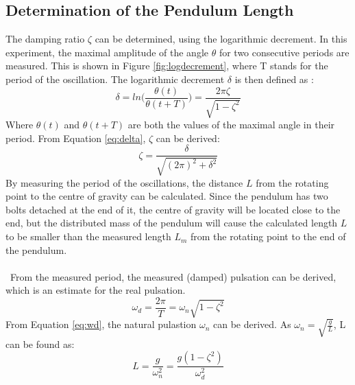 \documentclass[a4paper,kul]{kulakarticle} %
\begin{document}
\subsection{Determination of the Pendulum Length}
The damping ratio $\zeta$ can be determined, using the logarithmic decrement. In this experiment, the maximal amplitude of the angle $\theta$ for two consecutive periods are measured. This is shown in Figure \ref{fig:logdecrement}, where T stands for the period of the oscillation. The logarithmic decrement $\delta$ is then defined as \cite{slidestrillingen}:
\begin{equation}
	\delta = ln\bigg(\frac{\theta(t)}{\theta(t+T)}\bigg) = \frac{2\pi\zeta}{\sqrt{1-\zeta^2}}
	\label{eq:delta}
	\end{equation}
	Where $\theta(t)$ and $\theta(t+T)$ are both the values of the maximal angle in their period. From Equation \ref{eq:delta}, $\zeta$ can be derived:
	\begin{equation}
	\zeta = \frac{\delta}{\sqrt{(2\pi)^2+\delta^2}}
\end{equation}
By measuring the period of the oscillations, the distance $L$ from the rotating point to the centre of gravity can be calculated. Since the pendulum has two bolts detached at the end of it, the centre of gravity will be located close to the end, but the distributed mass of the pendulum will cause the calculated length $L$ to be smaller than the measured length $L_m$ from the rotating point to the end of the pendulum.
\\\\\
From the measured period, the measured (damped) pulsation can be derived, which is an estimate for the real pulsation. 
\begin{equation}
	\omega_d = \frac{2\pi}{T} = \omega_n\sqrt{1-\zeta^2}
	\label{eq:wd}
	\end{equation}
	From Equation \ref{eq:wd}, the natural pulastion $\omega_n$ can be derived. As $\omega_n = \sqrt{\frac{g}{L}}$, L can be found as:
	\begin{equation}
	L = \frac{g}{\omega_n^2} = \frac{g(1-\zeta^2)}{\omega_d^2}
\end{equation}
\end{document}
